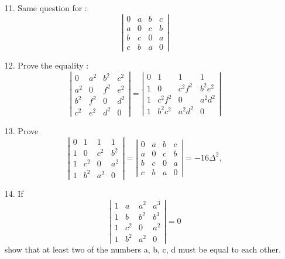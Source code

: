\documentclass[11pt]{amsbook}
\begin{document}
	\begin{enumerate}
		\item[11.]
		Same question for :
		\[ \left|
	     \begin{array}{cccc}
	        0 & a & b & c\\
	        a & 0 & c & b\\
	        b & c & 0 & a\\
	        c & b & a & 0
		\end{array}
    	\right| \]

    	\item[12.]
    	Prove the equality :
    	\[ \left| \begin{array}{llll}
	        0 & a^2 & b^2 & c^2\\
	        a^2 & 0 & f^2 & e^2\\  
	        b^2 & f^2 & 0 & d^2\\
	        c^2 & e^2 & d^2 & 0
    	\end{array} \right|
    	=
    	\left| \begin{array}{cccc}
	        0 & 1 & 1 & 1\\
	        1 & 0 & c^2f^2 & b^2e^2\\
	        1 & c^2f^2 & 0 & a^2d^2\\
	        1 & b^2c^2 & a^2d^2 & 0
    	\end{array} \right| \] 

    	\item[13.]
    	Prove
    	\[ \left| \begin{array}{llll}
	        0 & 1 & 1 & 1\\
	        1 & 0 & c^2 & b^2\\  
	        1 & c^2 & 0 & a^2\\
	        1 & b^2 & a^2 & 0
	    \end{array} \right|
	    =
	    \left| \begin{array}{cccc}
	        0 & a & b & c\\
	        a & 0 & c & b\\  
	        b & c & 0 & a\\
	        c & b & a & 0
    	\end{array} \right|
    	=
    	-16\Delta^2,
		\]
    	
		\item[14.]
		If
		\[ \left| \begin{array}{cccc}
	        1 & a & a^2 & a^3\\
	        1 & b & b^2 & b^3\\  
	        1 & c^2 & 0 & a^2\\
	        1 & b^2 & a^2 & 0
   		 \end{array} \right|
    		=
    		0 
    	\] 
     	show that at least two of the numbers a, b, c, d must be equal to each other.


\end{enumerate}
\end{document}
